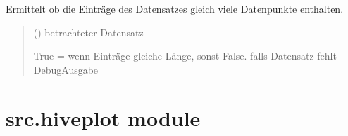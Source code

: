 \documentclass[a4paper,10pt,ngerman]{sphinxmanual}
\begin{document}
\begin{fulllineitems}
\begin{fulllineitems}
\label{\detokenize{api:src.experiments.DataCollector.validate}}
\pysigstartsignatures
\pysiglinewithargsret
{}
{}
{}
\pysigstopsignatures
\sphinxAtStartPar
Ermittelt ob die Einträge des Datensatzes gleich viele Datenpunkte enthalten.
\begin{quote}\begin{description}
\sphinxAtStartPar
{} () \textendash{} betrachteter Datensatz

\sphinxAtStartPar
True = wenn Einträge gleiche Länge, sonst False. falls Datensatz fehlt Debug\sphinxhyphen{}Ausgabe

\sphinxAtStartPar
{}

\end{description}\end{quote}

\end{fulllineitems}


\end{fulllineitems}



\section{src.hiveplot module}
\label{\detokenize{api:module-src.hiveplot}}\label{\detokenize{api:src-hiveplot-module}}
\end{document}
